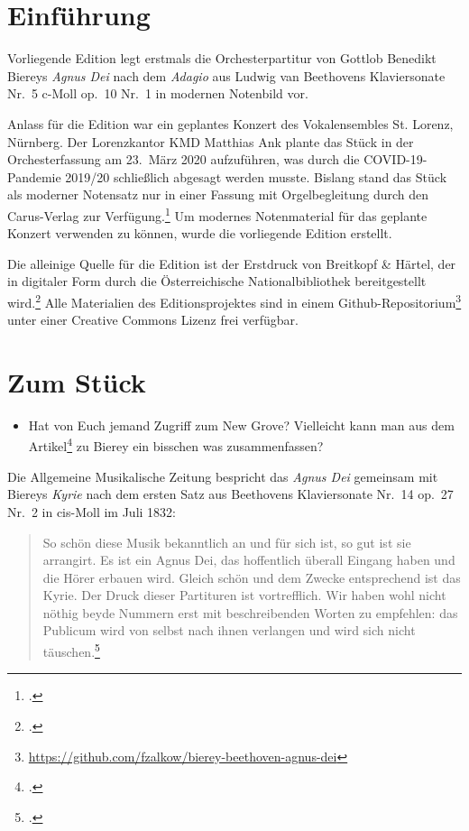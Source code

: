 \documentclass[paper=A3,12pt]{scrartcl}
\begin{document}
\thispagestyle{empty}

\section{Einführung}

Vorliegende Edition legt erstmals die Orchesterpartitur von Gottlob Benedikt Biereys \textit{Agnus Dei} nach dem \textit{Adagio} aus Ludwig van Beethovens Klaviersonate Nr.~5 c-Moll op.~10 Nr.~1 in modernen Notenbild vor.\medskip

Anlass für die Edition war ein geplantes Konzert des Vokalensembles St. Lorenz, Nürnberg.
Der Lorenzkantor KMD Matthias Ank plante das Stück in der Orchesterfassung am 23.\ März 2020 aufzuführen, was durch die COVID-19-Pandemie 2019/20 schließlich abgesagt werden musste.
Bislang stand das Stück als moderner Notensatz nur in einer Fassung mit Orgelbegleitung durch den Carus-Verlag zur Verfügung.\footcite{2018_Schumacher_AgnusDei_Carus}
Um modernes Notenmaterial für das geplante Konzert verwenden zu können, wurde die vorliegende Edition erstellt.\medskip

Die alleinige Quelle für die Edition ist der Erstdruck von Breitkopf \& Härtel, der in digitaler Form durch die Österreichische Nationalbibliothek bereitgestellt wird.\footcite{Bierey_AgnusDei_Breitkopf}
Alle Materialien des Editionsprojektes sind in einem Github-Repositorium\footnote{\url{https://github.com/fzalkow/bierey-beethoven-agnus-dei}} unter einer Creative Commons Lizenz frei verfügbar.

\section{Zum Stück}

\begin{itemize}
\item  Hat von Euch jemand Zugriff zum New Grove? Vielleicht kann man aus dem Artikel\footcite{2001_Haertwig_Bierey_Grove} zu Bierey ein bisschen was zusammenfassen?
\end{itemize}

Die Allgemeine Musikalische Zeitung bespricht das \textit{Agnus Dei} gemeinsam mit Biereys \textit{Kyrie} nach dem ersten Satz aus Beethovens Klaviersonate Nr.~14 op.~27 Nr.~2 in cis-Moll im Juli 1832:

\begin{quote}
  So schön diese Musik bekanntlich an und für sich ist, so gut ist sie arrangirt.
  Es ist ein Agnus Dei, das hoffentlich überall Eingang haben und die Hörer erbauen wird.
  Gleich schön und dem Zwecke entsprechend ist das Kyrie.
  Der Druck dieser Partituren ist vortrefflich.
  Wir haben wohl nicht nöthig beyde Nummern erst mit beschreibenden Worten zu empfehlen:
  das Publicum wird von selbst nach ihnen verlangen und wird sich nicht täuschen.\footcite{1832_NA_Rezension_AMZ}
\end{quote}
\end{document}
